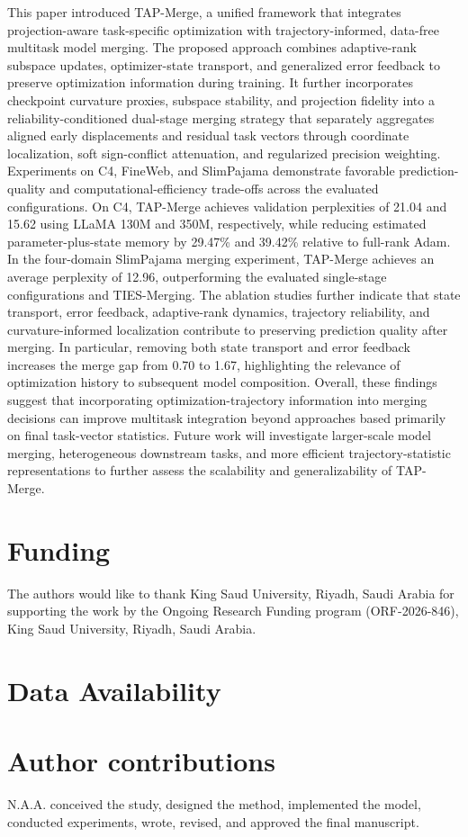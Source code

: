 \documentclass[fleqn,10pt]{wlscirep}
\begin{document}
This paper introduced TAP-Merge, a unified framework that integrates projection-aware task-specific optimization with trajectory-informed, data-free multitask model merging. The proposed approach combines adaptive-rank subspace updates, optimizer-state transport, and generalized error feedback to preserve optimization information during training. It further incorporates checkpoint curvature proxies, subspace stability, and projection fidelity into a reliability-conditioned dual-stage merging strategy that separately aggregates aligned early displacements and residual task vectors through coordinate localization, soft sign-conflict attenuation, and regularized precision weighting. Experiments on C4, FineWeb, and SlimPajama demonstrate favorable prediction-quality and computational-efficiency trade-offs across the evaluated configurations. On C4, TAP-Merge achieves validation perplexities of 21.04 and 15.62 using LLaMA 130M and 350M, respectively, while reducing estimated parameter-plus-state memory by 29.47\% and 39.42\% relative to full-rank Adam. In the four-domain SlimPajama merging experiment, TAP-Merge achieves an average perplexity of 12.96, outperforming the evaluated single-stage configurations and TIES-Merging. The ablation studies further indicate that state transport, error feedback, adaptive-rank dynamics, trajectory reliability, and curvature-informed localization contribute to preserving prediction quality after merging. In particular, removing both state transport and error feedback increases the merge gap from 0.70 to 1.67, highlighting the relevance of optimization history to subsequent model composition. Overall, these findings suggest that incorporating optimization-trajectory information into merging decisions can improve multitask integration beyond approaches based primarily on final task-vector statistics. Future work will investigate larger-scale model merging, heterogeneous downstream tasks, and more efficient trajectory-statistic representations to further assess the scalability and generalizability of TAP-Merge.


\section*{Funding}
The authors would like to thank King Saud University, Riyadh, Saudi Arabia for supporting the work by the Ongoing Research Funding program (ORF-2026-846), King Saud University, Riyadh, Saudi Arabia.








\section*{Data Availability}








\section*{Author contributions}
N.A.A. conceived the study, designed the method, implemented the model, conducted experiments, wrote, revised, and approved the final manuscript.
\end{document}
